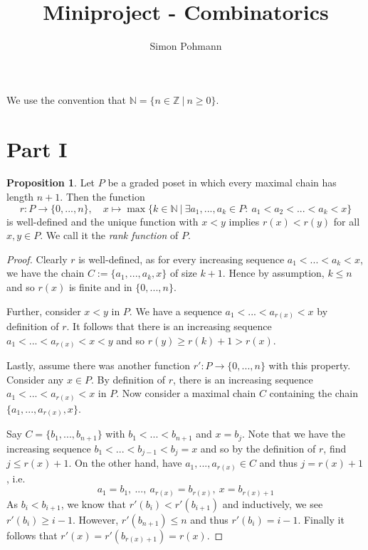 \documentclass{scrartcl}
\title{Miniproject - Combinatorics}
\author{Simon Pohmann}
\date{}
\newcommand{\N}{\mathbb{N}}
\newcommand{\Z}{\mathbb{Z}}
\theoremstyle{definition}
\newtheorem{proposition}[definition]{Proposition}
\begin{document}
\maketitle

We use the convention that $\N = \{ n \in \Z \ | \ n \geq 0 \}$.

\section{Part I}

\begin{proposition}
    \label{prop:definition_rank_function}
    Let $P$ be a graded poset in which every maximal chain has length $n + 1$. Then the function
    \begin{equation*}
        r: P \to \{ 0, ..., n \}, \quad x \mapsto \max\{ k \in \N \ | \ \exists a_1, ..., a_k \in P: \ a_1 < a_2 < ... < a_k < x \}
    \end{equation*}
    is well-defined and the unique function with $x < y$ implies $r(x) < r(y)$ for all $x, y \in P$.
    We call it the \emph{rank function} of $P$.
\end{proposition}
\begin{proof}
    Clearly $r$ is well-defined, as for every increasing sequence $a_1 < ... < a_k < x$, we have the chain $C := \{ a_1, ..., a_k, x \}$ of size $k + 1$.
    Hence by assumption, $k \leq n$ and so $r(x)$ is finite and in $\{ 0, ..., n \}$.

    Further, consider $x < y$ in $P$.
    We have a sequence $a_1 < ... < a_{r(x)} < x$ by definition of $r$.
    It follows that there is an increasing sequence $a_1 < ... < a_{r(x)} < x < y$ and so $r(y) \geq r(k) + 1 > r(x)$.

    Lastly, assume there was another function $r': P \to \{ 0, ..., n \}$ with this property.
    Consider any $x \in P$.
    By definition of $r$, there is an increasing sequence $a_1 < ... < a_{r(x)} < x$ in $P$.
    Now consider a maximal chain $C$ containing the chain $\{ a_1, ..., a_{r(x)}, x \}$.

    Say $C = \{ b_1, ..., b_{n + 1} \}$ with $b_1 < ... < b_{n + 1}$ and $x = b_j$.
    Note that we have the increasing sequence $b_1 < ... < b_{j - 1} < b_j = x$ and so by the definition of $r$, find $j \leq r(x) + 1$.
    On the other hand, have $a_1, ..., a_{r(x)} \in C$ and thus $j = r(x) + 1$, i.e.
    \begin{equation*}
        a_1 = b_1, \ ..., \ a_{r(x)} = b_{r(x)}, \ x = b_{r(x) + 1}
    \end{equation*}
    As $b_i < b_{i + 1}$, we know that $r'(b_i) < r'(b_{i + 1})$ and inductively, we see $r'(b_i) \geq i - 1$.
    However, $r'(b_{n + 1}) \leq n$ and thus $r'(b_i) = i - 1$.
    Finally it follows that $r'(x) = r'(b_{r(x) + 1}) = r(x)$.
\end{proof}
\end{document}

